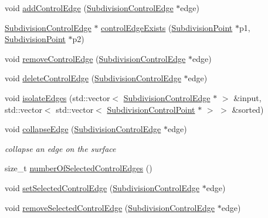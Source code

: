 \begin{DoxyCompactItemize}
\item 
void \hyperlink{classShipCAD_1_1SubdivisionSurface_acfec50abf57a44ed47038ecc55f5a600}{add\-Control\-Edge} (\hyperlink{classShipCAD_1_1SubdivisionControlEdge}{Subdivision\-Control\-Edge} $\ast$edge)
\item 
\hyperlink{classShipCAD_1_1SubdivisionControlEdge}{Subdivision\-Control\-Edge} $\ast$ \hyperlink{classShipCAD_1_1SubdivisionSurface_a6a89be4440e3adfcb0b14c164db891ae}{control\-Edge\-Exists} (\hyperlink{classShipCAD_1_1SubdivisionPoint}{Subdivision\-Point} $\ast$p1, \hyperlink{classShipCAD_1_1SubdivisionPoint}{Subdivision\-Point} $\ast$p2)
\item 
void \hyperlink{classShipCAD_1_1SubdivisionSurface_a3aac4d6c8ad638234f88fb8b1ffa00cb}{remove\-Control\-Edge} (\hyperlink{classShipCAD_1_1SubdivisionControlEdge}{Subdivision\-Control\-Edge} $\ast$edge)
\item 
void \hyperlink{classShipCAD_1_1SubdivisionSurface_ae45fc2694977c8fbae54ac2e0e067d1f}{delete\-Control\-Edge} (\hyperlink{classShipCAD_1_1SubdivisionControlEdge}{Subdivision\-Control\-Edge} $\ast$edge)
\item 
void \hyperlink{classShipCAD_1_1SubdivisionSurface_a975c97ca338eb2aaaa3dcc0640611a95}{isolate\-Edges} (std\-::vector$<$ \hyperlink{classShipCAD_1_1SubdivisionControlEdge}{Subdivision\-Control\-Edge} $\ast$ $>$ \&input, std\-::vector$<$ std\-::vector$<$ \hyperlink{classShipCAD_1_1SubdivisionControlPoint}{Subdivision\-Control\-Point} $\ast$ $>$ $>$ \&sorted)
\item 
void \hyperlink{classShipCAD_1_1SubdivisionSurface_acb0b35c10fe6ab3c348f8435a1ca844d}{collapse\-Edge} (\hyperlink{classShipCAD_1_1SubdivisionControlEdge}{Subdivision\-Control\-Edge} $\ast$edge)
\begin{DoxyCompactList}\small\item\em collapse an edge on the surface \end{DoxyCompactList}\item 
size\-\_\-t \hyperlink{classShipCAD_1_1SubdivisionSurface_a28f394042987ccc30d947ddd98a62574}{number\-Of\-Selected\-Control\-Edges} ()
\item 
void \hyperlink{classShipCAD_1_1SubdivisionSurface_ae1ceb8323935d0734fe4dc9c324aca16}{set\-Selected\-Control\-Edge} (\hyperlink{classShipCAD_1_1SubdivisionControlEdge}{Subdivision\-Control\-Edge} $\ast$edge)
\item 
void \hyperlink{classShipCAD_1_1SubdivisionSurface_a579077d742f9afc4e1d4ad20ef5a2184}{remove\-Selected\-Control\-Edge} (\hyperlink{classShipCAD_1_1SubdivisionControlEdge}{Subdivision\-Control\-Edge} $\ast$edge)

\end{DoxyCompactItemize}
